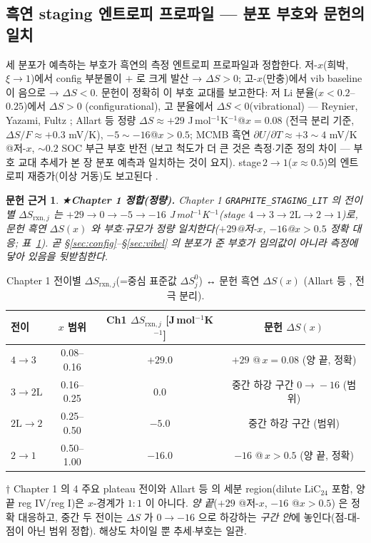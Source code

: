 \documentclass[11pt,a4paper]{article}
\newtheorem*{srcbox}{문헌 근거}
\newcommand{\rxn}{\mathrm{rxn}}
\begin{document}
\subsection{흑연 staging 엔트로피 프로파일 — 분포 부호와 문헌의 일치}
세 분포가 예측하는 부호가 흑연의 측정 엔트로피 프로파일과 정합한다. 저-$x$(희박, $\xi\to1$)에서 config
부분몰이 $+$ 로 크게 발산 → $\Delta S>0$; 고-$x$(만충)에서 vib baseline 이 음으로 → $\Delta S<0$.
문헌이 정확히 이 부호 교대를 보고한다: 저 Li 분율($x<0.2$--$0.25$)에서 $\Delta S>0$
(configurational), 고 분율에서 $\Delta S<0$(vibrational) — Reynier, Yazami, Fultz \cite{reynier2003};
Allart 등 \cite{allart2018} 정량 $\Delta S\approx+29$ J\,mol$^{-1}$K$^{-1}$@$x{=}0.08$
(전극 분리 기준, $\Delta S/F\approx+0.3$ mV/K), $-5\sim-16$@$x>0.5$; MCMB 흑연
$\partial U/\partial T\approx+3\sim4$ mV/K @저-$x$, $\sim0.2$ SOC 부근 부호 반전 \cite{msmr_partII}
(보고 척도가 더 큰 것은 측정$\cdot$기준 정의 차이 — 부호 교대 추세가 본 장 분포 예측과 일치하는 것이
요지). stage\,$2\!\to\!1$($x\approx0.5$)의 엔트로피 재증가(이상 거동)도 보고된다
\cite{reynier2003,allart2018}.

\begin{srcbox}
★\textbf{Chapter 1 정합(정량).} Chapter 1 \texttt{GRAPHITE\_STAGING\_LIT} 의 전이별 $\Delta S_{\rxn,j}$ 는
$+29\to0\to-5\to-16$ J\,mol$^{-1}$K$^{-1}$(stage $4\!\to\!3\!\to\!2\mathrm L\!\to\!2\!\to\!1$)로, 문헌 흑연
$\Delta S(x)$ \cite{allart2018} 와 \emph{부호$\cdot$규모가 정량 일치}한다($+29$@저-$x$, $-16$@$x>0.5$ 정확
대응; 표~\ref{tab:ds}). 곧 \S\ref{sec:config}--\S\ref{sec:vibel} 의 분포가 준 부호가 임의값이 아니라
측정에 닿아 있음을 뒷받침한다.
\end{srcbox}

\begin{table}[t]
\centering\small
\renewcommand{\arraystretch}{1.2}
\caption{Chapter 1 전이별 $\Delta S_{\rxn,j}$(=중심 표준값 $\Delta S^0_j$) ↔ 문헌 흑연 $\Delta S(x)$
(Allart 등 \cite{allart2018}, 전극 분리).}
\label{tab:ds}
\begin{tabular}{l c c c}
\toprule
전이 & $x$ 범위 & Ch1 $\Delta S_{\rxn,j}$ [J\,mol$^{-1}$K$^{-1}$] & 문헌 $\Delta S(x)$ \\
\midrule
$4\!\to\!3$ & 0.08–0.16 & $+29.0$ & $+29$ @\,$x{=}0.08$ (양 끝, 정확) \\
$3\!\to\!2\mathrm L$ & 0.16–0.25 & $0.0$ & 중간 하강 구간 $0\!\to\!-16$ (범위) \\
$2\mathrm L\!\to\!2$ & 0.25–0.50 & $-5.0$ & 중간 하강 구간 (범위) \\
$2\!\to\!1$ & 0.50–1.00 & $-16.0$ & $-16$ @\,$x{>}0.5$ (양 끝, 정확) \\
\bottomrule
\end{tabular}

\smallskip
{\footnotesize $\dagger$ Chapter 1 의 4 주요 plateau 전이와 Allart 등 \cite{allart2018} 의 세분 region(dilute
LiC$_{24}$ 포함, 양 끝 reg IV/reg I)은 $x$-경계가 $1{:}1$ 이 아니다. \emph{양 끝}($+29$ @저-$x$, $-16$ @$x{>}0.5$)
은 정확 대응하고, 중간 두 전이는 $\Delta S$ 가 $0\to-16$ 으로 하강하는 \emph{구간 안}에 놓인다(점-대-점이 아닌
범위 정합). 해상도 차이일 뿐 추세$\cdot$부호는 일관.}
\end{table}
\end{document}
